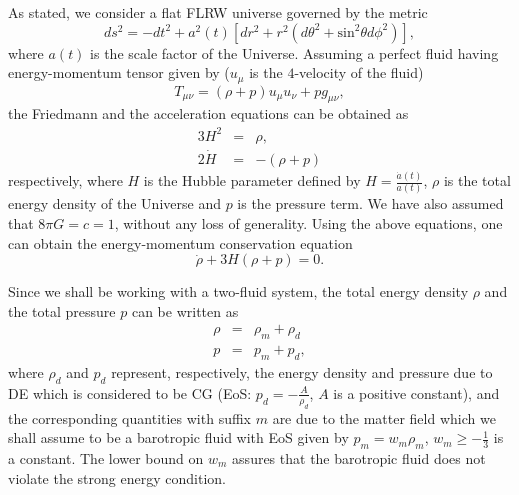 \documentclass[two-column, nofootinbib]{revtex4-1}
\begin{document}
As stated, we consider a flat FLRW universe governed by the metric
\begin{equation} \label{flrw}
ds^2=-dt^2+a^2(t)\left[dr^2+r^2\left(d\theta ^2 +\text{sin}^2\theta d\phi ^2\right)\right],
\end{equation}
where $a(t)$ is the scale factor of the Universe. Assuming a perfect fluid having energy-momentum tensor given by ($u_\mu$ is the $4$-velocity of the fluid)
\begin{equation}
T_{\mu \nu}=(\rho +p)u_{\mu}u_{\nu}+pg_{\mu \nu},
\end{equation}
the Friedmann and the acceleration equations can be obtained as
\begin{eqnarray}
3H^2 &=& \rho, \label{fe} \\
2\dot{H} &=& -(\rho +p) \label{ae}
\end{eqnarray}
respectively, where $H$ is the Hubble parameter defined by $H=\frac{\dot{a}(t)}{a(t)}$, $\rho$ is the total energy density of the Universe and $p$ is the pressure term. We have also assumed that $8\pi G=c=1$, without any loss of generality. Using the above equations, one can obtain the energy-momentum conservation equation 
\begin{equation} \label{ce}
\dot{\rho}+3H(\rho +p)=0.
\end{equation}

Since we shall be working with a two-fluid system, the total energy density $\rho$ and the total pressure $p$ can be written as
\begin{eqnarray}
\rho &=& \rho_m+\rho_d \label{rho} \\
p &=& p_m+p_d, \label{p}
\end{eqnarray}
where $\rho_d$ and $p_d$ represent, respectively, the energy density and pressure due to DE which is considered to be CG (EoS: $p_d=-\frac{A}{\rho _d}$, $A$ is a positive constant), and the corresponding quantities with suffix $m$ are due to the matter field which we shall assume to be a barotropic fluid with EoS given by $p_m=w_m\rho_m$, $w_m \geq -\frac{1}{3}$ is a constant. The lower bound on $w_m$ assures that the barotropic fluid does not violate the strong energy condition.


\end{document}
